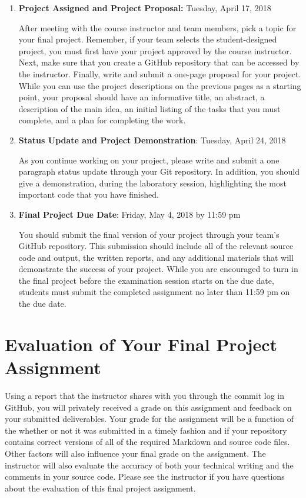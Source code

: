 \documentclass[11pt]{article}
\begin{document}
\begin{enumerate}

  \item {\bf Project Assigned and Project Proposal:} Tuesday, April 17, 2018

    After meeting with the course instructor and team members, pick a topic for
    your final project. Remember, if your team selects the student-designed
    project, you must first have your project approved by the course instructor.
    Next, make sure that you create a GitHub repository that can be accessed by
    the instructor. Finally, write and submit a one-page proposal for your
    project. While you can use the project descriptions on the previous pages as
    a starting point, your proposal should have an informative title, an
    abstract, a description of the main idea, an initial listing of the tasks
    that you must complete, and a plan for completing the work.

  \item {\bf Status Update and Project Demonstration}: Tuesday, April 24, 2018

    As you continue working on your project, please write and submit a one
    paragraph status update through your Git repository. In addition, you should
    give a demonstration, during the laboratory session, highlighting the most
    important code that you have finished.

  \item {\bf Final Project Due Date}: Friday, May 4, 2018 by 11:59 pm

    You should submit the final version of your project through your team's
    GitHub repository. This submission should include all of the relevant source
    code and output, the written reports, and any additional materials that will
    demonstrate the success of your project. While you are encouraged to turn in
    the final project before the examination session starts on the due date,
    students must submit the completed assignment no later than 11:59 pm on the
    due date.

\end{enumerate}

\section*{Evaluation of Your Final Project Assignment}

Using a report that the instructor shares with you through the commit log in GitHub, you will privately received a grade
on this assignment and feedback on your submitted deliverables. Your grade for the assignment will be a function of the
whether or not it was submitted in a timely fashion and if your repository contains correct versions of all of the
required Markdown and source code files. Other factors will also influence your final grade on the assignment. The
instructor will also evaluate the accuracy of both your technical writing and the comments in your source code. Please
see the instructor if you have questions about the evaluation of this final project assignment.
\end{document}
